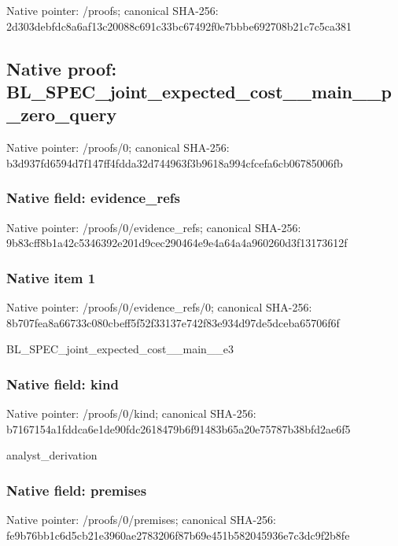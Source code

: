 \documentclass[10pt,a4paper]{article}
\begin{document}
Native pointer: /proofs; canonical SHA-256: 2d303debfdc8a6af13c20088\allowbreak{}c691c33bc67492f0e7bbbe69\allowbreak{}2708b21c7c5ca381



\subsection{Native proof: BL\_SPEC\_joint\_expected\_c\allowbreak{}ost\_\_main\_\_p\_zero\_query}


Native pointer: /proofs/0; canonical SHA-256: b3d937fd6594d7f147ff4fdd\allowbreak{}a32d744963f3b9618a994cfc\allowbreak{}efa6cb06785006fb



\subsubsection{Native field: evidence\_refs}


Native pointer: /proofs/0/evidence\_refs; canonical SHA-256: 9b83cff8b1a42c5346392e20\allowbreak{}1d9cec290464e9e4a64a4a96\allowbreak{}0260d3f13173612f



\subsubsection{Native item 1}


Native pointer: /proofs/0/evidence\_refs/0; canonical SHA-256: 8b707fea8a66733c080cbeff\allowbreak{}5f52f33137e742f83e934d97\allowbreak{}de5dceba65706f6f


BL\_SPEC\_joint\_expected\_cost\_\_main\_\_e3


\subsubsection{Native field: kind}


Native pointer: /proofs/0/kind; canonical SHA-256: b7167154a1fddca6e1de90fd\allowbreak{}c2618479b6f91483b65a20e7\allowbreak{}5787b38bfd2ae6f5


analyst\_derivation


\subsubsection{Native field: premises}


Native pointer: /proofs/0/premises; canonical SHA-256: fe9b76bb1c6d5cb21e3960ae\allowbreak{}2783206f87b69e451b582045\allowbreak{}936e7c3dc9f2b8fe
\end{document}
